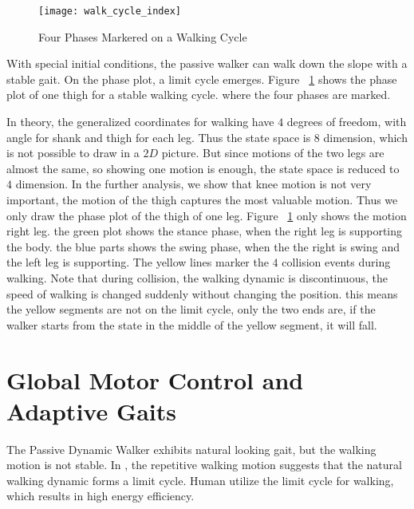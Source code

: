 \begin{figure}[!htbp]
  \begin{center}
    \texttt{[image: walk\_cycle\_index]}
    \caption{Four Phases Markered on a Walking Cycle}
    \label{fig:phasesmaker}
\end{center}
\end{figure}

With special initial conditions, the passive walker can walk down the slope with a stable gait.
On the phase plot,  a limit cycle emerges. 
Figure ~\ref{fig:phasesmaker} shows the phase plot of one thigh for a stable walking cycle.
where the four phases are marked. 

In theory, the generalized coordinates for walking have $4$ degrees of freedom, with angle for shank and thigh for each leg.
Thus the state space is $8$ dimension, which is not possible to draw in a $2D$ picture.
But since motions of the two legs are almost the same, so showing one motion is enough, the state space is reduced to $4$ dimension.
In the further analysis, we show that knee motion is not very important, the motion of the thigh captures the most valuable motion.
Thus we only draw the phase plot of the thigh of one leg.
Figure ~\ref{fig:phasesmaker} only shows the motion right leg.
the green plot shows the stance phase, when the right leg is supporting the body.
the blue parts shows the swing phase, when the the right is swing and the left leg is supporting.
The yellow lines marker the $4$ collision events during walking.
Note that during collision, the walking dynamic is discontinuous, the speed of walking is changed suddenly without changing the position.
this means the yellow segments are not on the limit cycle, only the two ends are, if the walker starts from the state in the middle of the yellow segment, it will fall.











\section{Global Motor Control and Adaptive Gaits}
The Passive Dynamic Walker exhibits natural looking gait, but the walking motion is not stable.
In \moit, the repetitive walking motion suggests that the natural walking dynamic forms a limit cycle.
Human utilize the limit cycle for walking, which results in high energy efficiency.

